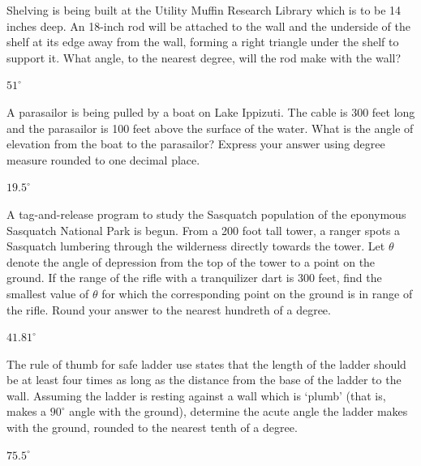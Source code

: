 \documentclass{ximera}
\begin{document}
\begin{problem}
Shelving is being built at the Utility Muffin Research Library which is to be 14 inches deep.  An 18-inch rod will be attached to the wall and the underside of the shelf at its edge away from the wall, forming a right triangle under the shelf to support it.  What angle, to the nearest degree, will the rod make with the wall?

\begin{solution}
$51^{\circ}$
\end{solution}
\end{problem}

\begin{problem}
A parasailor is being pulled by a boat on Lake Ippizuti.  The cable is 300 feet long and the parasailor is 100 feet above the surface of the water.  What is the angle of elevation from the boat to the parasailor?  Express your answer using degree measure rounded to one decimal place.

\begin{solution}
$19.5^{\circ}$
\end{solution}
\end{problem}

\begin{problem}
A tag-and-release program to study the Sasquatch population of the eponymous Sasquatch National Park is begun.  From a 200 foot tall tower, a ranger spots a Sasquatch lumbering through the wilderness directly towards the tower.  Let $\theta$ denote the angle of depression from the top of the tower to a point on the ground.  If the range of the rifle with a tranquilizer dart is 300 feet, find the smallest value of $\theta$ for which the corresponding point on the ground is in range of the rifle.  Round your answer to the nearest hundreth of a degree.

\begin{solution}
$41.81^{\circ}$
\end{solution}
\end{problem}

\begin{problem}
The rule of thumb for safe ladder use states that the length of the ladder should be at least four times as long as the distance from the base of the ladder to the wall. Assuming the ladder is resting against a wall which is `plumb' (that is, makes a $90^{\circ}$ angle with the ground), determine the acute angle the ladder makes with the ground, rounded to the nearest tenth of a degree.

\begin{solution}
$75.5^{\circ}$
\end{solution}

\end{problem}
\end{document}
